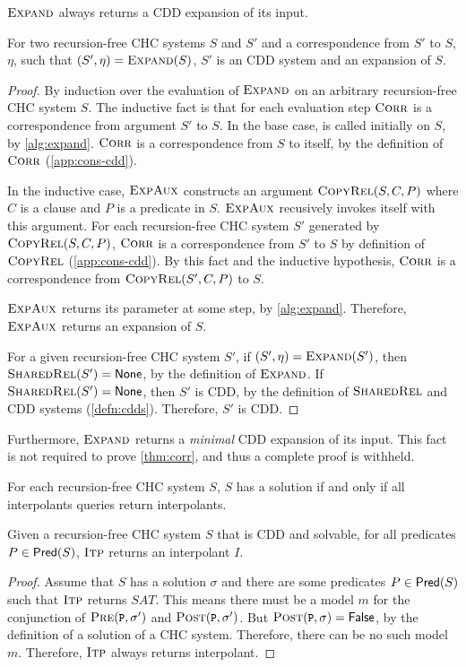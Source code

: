 $\textsc{Expand}$ always returns a CDD expansion of its input.
%
\begin{lem}
  \label{lem:expand-corr}
  For two recursion-free CHC systems $S$ and $S'$ and a correspondence
  from $S'$ to $S$, $\eta$, such that $(S', \eta) = \textsc{Expand}(S)$,
  $S'$ is an CDD system and an expansion of $S$.
\end{lem}
%
\begin{proof}
  By induction over the evaluation of $\textsc{Expand}$ on
  an arbitrary recursion-free CHC system $S$.
  The inductive fact is that for each evaluation step
  $\textsc{Corr}$ is a correspondence from argument
  $S'$ to $S$.
  In the base case, \expandaux is called initially on $S$,
  by \autoref{alg:expand}.
  $\textsc{Corr}$ is a correspondence from $S$ to itself, by the definition of
  $\textsc{Corr}$
  (\autoref{app:cons-cdd}).

  In the inductive case,
  $\textsc{ExpAux}$ constructs an argument
  $\textsc{CopyRel}(S, C, P)$
  where $C$ is a clause and $P$ is a predicate in $S$.
  $\textsc{ExpAux}$ recusively invokes itself with this argument.
  For each recursion-free CHC system $S'$ generated by $\textsc{CopyRel}(S, C, P)$,
  $\textsc{Corr}$ is a correspondence from $S'$ to
  $S$ by definition of $\textsc{CopyRel}$
  (\autoref{app:cons-cdd}).
  By this fact and the inductive hypothesis, $\textsc{Corr}$ is
  a correspondence from $\textsc{CopyRel}(S',
  C, P)$ to $S$.

  $\textsc{ExpAux}$ returns its parameter at some step, by
  \autoref{alg:expand}.
  Therefore, $\textsc{ExpAux}$ returns an expansion of $S$.

  For a given recursion-free CHC system $S'$, if $(S', \eta) =
  \textsc{Expand}(S')$,
  then $\textsc{SharedRel}(S') = \mathsf{None}$, by the definition of $\textsc{Expand}$.
  If $\textsc{SharedRel}(S') = \mathsf{None}$, then $S'$ is
  CDD, by the definition of $\textsc{SharedRel}$ and CDD systems
  (\autoref{defn:cdds}).
  Therefore, $S'$ is CDD.
\end{proof}
%
Furthermore, $\textsc{Expand}$ returns a \emph{minimal} CDD
expansion of its input.
%
This fact is not required to prove \autoref{thm:corr}, and thus a
complete proof is withheld.

For each recursion-free CHC system $S$, $S$ has a solution if and only
if all interpolants queries return interpolants.
%
\begin{lem}
  \label{lem:vc}
  Given a recursion-free CHC system $S$ that is CDD and solvable, for
  all predicates $P \in \mathsf{Pred}( S )$,
  $\textsc{Itp}$ returns
  an interpolant $I$.
\end{lem}
%
\begin{proof}
  Assume that $S$ has a solution $\sigma$ and there are some
  predicates $P \in \mathsf{Pred}( S )$ such that
  $\textsc{Itp}$
  returns $SAT$. This means there must be a model $m$ for the
  conjunction of $\prectr(\cc{P},\sigma')$ and
  $\postctr(\cc{P},\sigma')$.
  But $\postctr(\cc{P},\sigma) = \false$, by the definition of
  a solution of a CHC system.
  Therefore, there can be no such model $m$.
  Therefore,
  $\textsc{Itp}$ always
  returns interpolant.
\end{proof}

